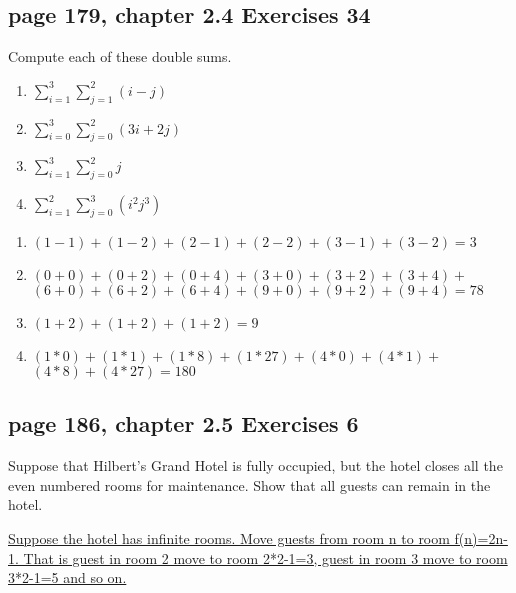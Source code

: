 \documentclass[sigconf]{acmart}
\begin{document}
\subsection{page 179, chapter 2.4 Exercises 34}
\begin{shaded}
    Compute each of these double sums.
    \begin{enumerate}[label=(\alph*)]
    	\item $\sum\limits_{i=1}^3 \sum\limits_{j=1}^2 (i-j)$
    	\item $\sum\limits_{i=0}^3 \sum\limits_{j=0}^2 (3i+2j)$
    	\item $\sum\limits_{i=1}^3 \sum\limits_{j=0}^2 j$
    	\item $\sum\limits_{i=1}^2 \sum\limits_{j=0}^3 (i^2j^3)$
    \end{enumerate}
\end{shaded}  
\begin{enumerate}[label=(\alph*)]
	\item $(1-1)+(1-2)+(2-1)+(2-2)+(3-1)+(3-2) = 3$
	\item \uline{$(0+0)+(0+2)+(0+4)+(3+0)+(3+2)+(3+4)+$}\\\uline{$(6+0)+(6+2)+(6+4)+(9+0)+(9+2)+(9+4) = 78$}
	\item \uline{$(1+2)+(1+2)+(1+2) = 9$}
	\item \uline{$(1*0)+(1*1)+(1*8)+(1*27)+(4*0)+(4*1)+$}\\\uline{$(4*8)+(4*27) = 180$}
\end{enumerate}

\subsection{page 186, chapter 2.5 Exercises 6}
\begin{shaded}
    Suppose that Hilbert’s Grand Hotel is fully occupied, but the hotel closes all the even numbered rooms for maintenance. Show that all guests can remain in the hotel.
\end{shaded}  
\uline{Suppose the hotel has infinite rooms. Move guests from room n to room f(n)=2n-1. That is guest in room 2 move to room 2*2-1=3, guest in room 3 move to room 3*2-1=5 and so on.}
\end{document}
